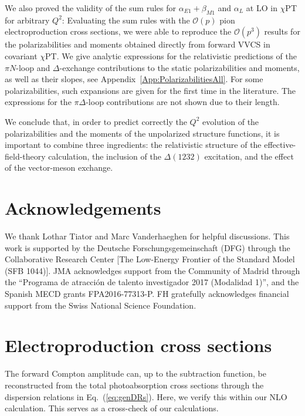 \documentclass[12pt,preprint,tightenlines,
showpacs,preprintnumbers,amsmath,amssymb,
a4paper,nofootinbib]{revtex4-1}
\def\Eqref#1{Eq.~(\ref{eq:#1})}
\begin{document}
We also proved the validity of the sum rules for $\alpha_{E1}+\beta_{M1}$ and $\alpha_L$ at LO in $\chi$PT for arbitrary $Q^2$:
Evaluating the sum rules with the $\mathcal{O}(p)$  pion electroproduction cross sections, we were able to reproduce the $\mathcal{O}(p^3)$ results for the polarizabilities and moments obtained directly from forward VVCS in covariant $\chi$PT.
We give analytic expressions for the relativistic predictions of the $\pi N$-loop and $\Delta$-exchange contributions to the static polarizabilities and moments, as well as their slopes, see Appendix~\ref{App:PolarizabilitiesAll}.
For some polarizabilities, such expansions are given for the first time in the literature. 
The expressions for the $\pi \Delta$-loop contributions are not shown due to their length.

We conclude that, in order to predict correctly the $Q^2$ evolution of the polarizabilities and the moments of the unpolarized structure functions, it is important to combine three ingredients: the relativistic structure of the effective-field-theory calculation, the inclusion of the $\Delta(1232)$ excitation, and the effect of the vector-meson exchange.

\section*{Acknowledgements}

We thank Lothar Tiator and Marc Vanderhaeghen for helpful discussions. This work is supported by the Deutsche Forschungsgemeinschaft (DFG) through the
Collaborative Research Center [The Low-Energy Frontier of the Standard Model (SFB 1044)]. JMA acknowledges support from the Community of Madrid through the ``Programa de atracci\'on de talento investigador 2017 (Modalidad 1)'', and the Spanish MECD grants FPA2016-77313-P. FH gratefully acknowledges financial support from the Swiss National Science Foundation.



\appendix
\small
\section{Electroproduction cross sections}\label{App:CrossSections}

The forward Compton amplitude can, up to the subtraction function, be
reconstructed from the total photoabsorption cross sections through the dispersion relations in \Eqref{genDRs}. Here, we verify this within our NLO calculation. This serves as a cross-check of our calculations.
\end{document}
